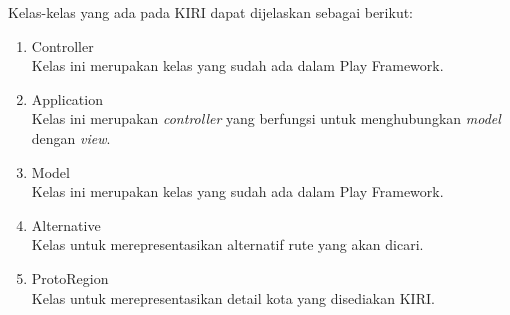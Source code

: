 Kelas-kelas yang ada pada KIRI dapat dijelaskan sebagai berikut:

\begin{enumerate}
	\item Controller\\
			Kelas ini merupakan kelas yang sudah ada dalam Play Framework.
	\item Application\\
			Kelas ini merupakan \textit{controller} yang berfungsi untuk menghubungkan \textit{model} dengan \textit{view}.
	\item Model\\
			Kelas ini merupakan kelas yang sudah ada dalam Play Framework.
	\item Alternative\\
			Kelas untuk merepresentasikan alternatif rute yang akan dicari.
	\item ProtoRegion\\
			Kelas untuk merepresentasikan detail kota yang disediakan KIRI.
\end{enumerate}
